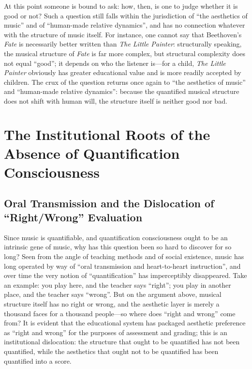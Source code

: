 \documentclass[11pt,a4paper]{article}
\begin{document}
At this point someone is bound to ask: how, then, is one to judge whether it is good or
not? Such a question still falls within the jurisdiction of ``the aesthetics of music'' and
of ``human-made relative dynamics'', and has no connection whatever with the structure of
music itself. For instance, one cannot say that Beethoven's \textit{Fate} is necessarily
better written than \textit{The Little Painter}: structurally speaking, the musical
structure of \textit{Fate} is far more complex, but structural complexity does not equal
``good''; it depends on who the listener is---for a child, \textit{The Little Painter} obviously
has greater educational value and is more readily accepted by children. The crux of the
question returns once again to ``the aesthetics of music'' and ``human-made relative
dynamics'': because the quantified musical structure does not shift with human will, the
structure itself is neither good nor bad.

\section{The Institutional Roots of the Absence of Quantification Consciousness}

\subsection{Oral Transmission and the Dislocation of ``Right/Wrong'' Evaluation}

Since music is quantifiable, and quantification consciousness ought to be an intrinsic gene
of music, why has this question been so hard to discover for so long? Seen from the angle
of teaching methods and of social existence, music has long operated by way of ``oral
transmission and heart-to-heart instruction'', and over time the very notion of
``quantification'' has imperceptibly disappeared. Take an example: you play here, and the
teacher says ``right''; you play in another place, and the teacher says ``wrong''. But on
the argument above, musical structure itself has no right or wrong, and the aesthetic layer
is merely a thousand faces for a thousand people---so where does ``right and wrong'' come
from? It is evident that the educational system has packaged aesthetic preference as
``right and wrong'' for the purposes of assessment and grading; this is an institutional
dislocation: the structure that ought to be quantified has not been quantified, while the
aesthetics that ought not to be quantified has been quantified into a score.
\end{document}
